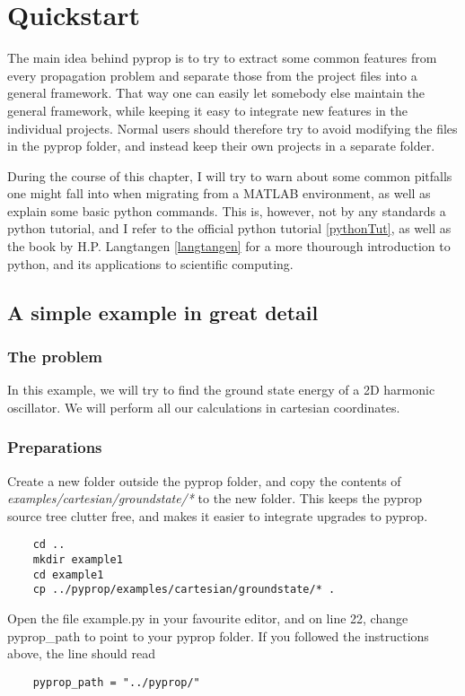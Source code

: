 \chapter{Quickstart}
The main idea behind pyprop is to try to extract some common features from every propagation problem and 
separate those from the project files into a general framework. 
That way one can easily let somebody else maintain the general framework, while keeping it easy to
integrate new features in the individual projects. Normal users should therefore try to avoid
modifying the files in the pyprop folder, and instead keep their own projects in a separate folder. 

During the course of this chapter, I will try to warn about some common pitfalls one might fall into
when migrating from a MATLAB environment, as well as explain some basic python commands. This is, however, 
not by any standards a python tutorial, and I refer to the official python tutorial \ref{pythonTut},
as well as the book by H.P. Langtangen \ref{langtangen} for a more thourough introduction to python, and
its applications to scientific computing.

\section{A simple example in great detail}
\subsection{The problem}
In this example, we will try to find the ground state energy of a 2D harmonic oscillator.
We will perform all our calculations in cartesian coordinates.

\subsection{Preparations}
Create a new folder outside the pyprop folder, and copy the contents of \textit{examples/cartesian/groundstate/*} to
the new folder. This keeps the pyprop source tree clutter free, and makes it easier to integrate upgrades to pyprop.
\begin{verbatim}
	cd ..
	mkdir example1
	cd example1
	cp ../pyprop/examples/cartesian/groundstate/* .
\end{verbatim}
Open the file example.py in your favourite editor, and on line 22, change pyprop\_path to point to your pyprop folder.
If you followed the instructions above, the line should read
\begin{verbatim}
	pyprop_path = "../pyprop/"
\end{verbatim}

